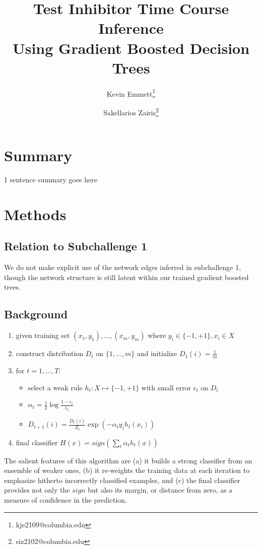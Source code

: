 \documentclass[letterpaper, 11pt]{article}
\title{Test Inhibitor Time Course Inference\\Using Gradient Boosted Decision Trees}
\author[1]{Kevin Emmett\thanks{kje2109@columbia.edu}}
\author[2]{Sakellarios Zairis\thanks{siz2102@columbia.edu}}
\affil[1]{Department of Physics, Columbia University}
\affil[2]{Department of Computational Biology \& Bioinformatics, Columbia University}
\begin{document}
\maketitle

\section{Summary}

1 sentence summary goes here

\section{Methods}

\subsection{Relation to Subchallenge 1}

We do not make explicit use of the network edges inferred in subchallenge 1, though the network structure is still latent within our trained gradient boosted trees.

\subsection{Background}
 
\begin{enumerate}
\item given training set $(x_1,y_1), ..., (x_m,y_m)$ where $y_i \in \{-1,+1\}, x_i \in X$
\item construct distribution $D_t$ on $\{1, ..., m\}$ and initialize $D_1(i) = \frac{1}{m}$
\item for $t = 1, ..., T$:
\begin{itemize}
\item select a weak rule $h_t : X \mapsto \{-1,+1\}$ with small error $\epsilon_t$ on $D_t$
\item $\alpha_t = \frac{1}{2} \log \frac{1 - \epsilon_t}{\epsilon_t}$
\item $D_{t+1}(i) = \frac{D_t(i)}{Z_t} \exp (-\alpha_t y_i h_t(x_i))$
\end{itemize}
\item final classifier $H(x) = sign( \sum_t \alpha_t h_t(x) )$
\end{enumerate}

The salient features of this algorithm are (a) it builds a strong classifier from an ensemble of weaker ones, (b) it re-weights the training data at each iteration to emphasize hitherto incorrectly classified examples, and (c) the final classifier provides not only the $sign$ but also its margin, or distance from zero, as a measure of confidence in the prediction.
\end{document}
